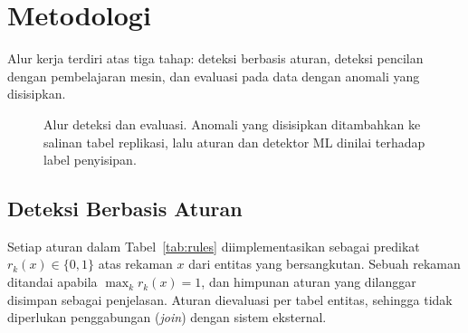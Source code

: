 \documentclass[conference]{IEEEtran}
\begin{document}

\section{Metodologi}\label{sec:method}
Alur kerja terdiri atas tiga tahap: deteksi berbasis aturan, deteksi pencilan dengan pembelajaran mesin, dan evaluasi pada data dengan anomali yang disisipkan.

\begin{figure}[htbp]
\centering
{}
\caption{Alur deteksi dan evaluasi. Anomali yang disisipkan ditambahkan ke salinan tabel replikasi, lalu aturan dan detektor ML dinilai terhadap label penyisipan.}
\label{fig:pipeline}
\end{figure}

\subsection{Deteksi Berbasis Aturan}
Setiap aturan dalam Tabel~\ref{tab:rules} diimplementasikan sebagai predikat $r_k(x)\in\{0,1\}$ atas rekaman $x$ dari entitas yang bersangkutan. Sebuah rekaman ditandai apabila $\max_k r_k(x)=1$, dan himpunan aturan yang dilanggar disimpan sebagai penjelasan. Aturan dievaluasi per tabel entitas, sehingga tidak diperlukan penggabungan (\textit{join}) dengan sistem eksternal.
\end{document}
